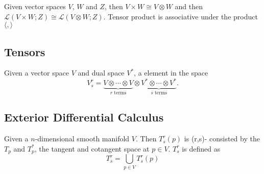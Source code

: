 \begin{theorem}
Given vector spaces $V$, $W$ and $Z$, then $V\times W\cong V\otimes W$ and then $\mathcal{L}(V\times W;Z)\cong\mathcal{L}(V\otimes W;Z)$. Tensor product is associative under the product $\langle,\rangle$
\end{theorem}

\subsection{Tensors}
\begin{definition}
Given a vector space $V$ and dual space $V^*$, a element in the space 
\begin{equation}
V^r_s=\underbrace{V\otimes\cdots\otimes V}_{r\text{ terms}}\otimes \underbrace{V^*\otimes\cdots\otimes V^*}_{s\text{ terms}}.
\end{equation}
\end{definition}

\subsection{Exterior Differential Calculus}
\begin{definition}
Given a $n$-dimensional smooth manifold $V$. Then $T^r_s(p)$ is (r,s)- consisted by the $T_p$ and $T^*_p$, the tangent and cotangent space at $p\in V$. $T^r_s$ is defined as
\begin{equation}
T^r_s=\bigcup_{p\in V}T^r_s(p)
\end{equation}
\end{definition}